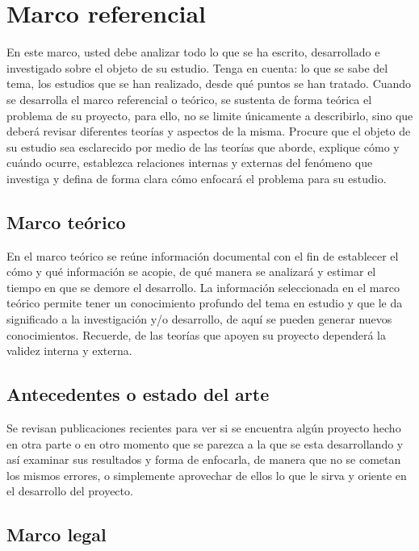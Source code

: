 \chapter{Marco referencial}

En este marco, usted debe analizar todo lo que se ha escrito, desarrollado e
investigado sobre el objeto de su estudio.
Tenga en cuenta: lo que se sabe del tema, los estudios que se han realizado,
desde qué puntos se han tratado. Cuando se desarrolla el marco referencial o
teórico, se sustenta de forma teórica el problema de su proyecto, para ello, no
se limite únicamente a describirlo, sino que deberá revisar diferentes teorías y
aspectos de la misma. Procure que el objeto de su estudio sea esclarecido por
medio de las teorías que aborde, explique cómo y cuándo ocurre, establezca
relaciones internas y externas del fenómeno que investiga y defina de forma
clara cómo enfocará el problema para su estudio.

\section{Marco teórico}

En el marco teórico se reúne información documental con el fin de establecer
el cómo y qué información se acopie, de qué manera se analizará y estimar el
tiempo en que se demore el desarrollo.
La información seleccionada en el marco teórico permite tener un
conocimiento profundo del tema en estudio y que le da significado a la
investigación y/o desarrollo, de aquí se pueden generar nuevos conocimientos.
Recuerde, de las teorías que apoyen su proyecto dependerá la validez interna
y externa. 

\section{Antecedentes o estado del arte}  

Se revisan publicaciones recientes para ver si se encuentra algún proyecto
hecho en otra parte o en otro momento que se parezca a la que se esta
desarrollando y así examinar sus resultados y forma de enfocarla, de manera
que no se cometan los mismos errores, o simplemente aprovechar de ellos lo
que le sirva y oriente en el desarrollo del proyecto.

\section{Marco legal}  
\lipsum[1]